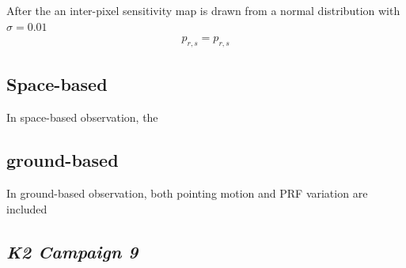 \documentclass[12pt, preprint]{aastex}
\newcommand{\project}[1]{\textsl{#1}}
\newcommand{\KTCN}{\project{K2 Campaign 9}}
\begin{document}
After the an inter-pixel sensitivity map is drawn from a normal distribution with $\sigma=0.01$ 
\begin{eqnarray}
p_{r,s} = p_{r,s} 
\end{eqnarray}

\subsection{Space-based}
In space-based observation, the 

\subsection{ground-based}
In ground-based observation, both pointing motion and PRF variation are included

\subsection{\KTCN}
\end{document}
